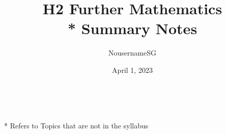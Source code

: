 
\title{H2 Further Mathematics \\* Summary Notes}
\author{NousernameSG}
\date{April 1, 2023}



\maketitle

\newpage \ \newpage \ \newpage

{\onecolumn \setcounter{tocdepth}{2} \tableofcontents}
\vfill
* Refers to Topics that are not in the syllabus
\newpage
\twocolumn

 \newpage
 \newpage
 \newpage
 \newpage
 \newpage
 \newpage
 \newpage
 \newpage



